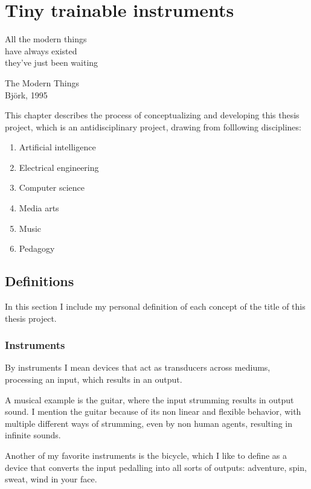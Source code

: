 \chapter{Tiny trainable instruments}

\epigraph{All the modern things \\ have always existed \\ they've just been waiting}{The Modern Things \\ Björk, 1995}

This chapter describes the process of conceptualizing and developing this thesis project, which is an antidisciplinary project, drawing from folllowing disciplines:

\begin{enumerate}
  \item Artificial intelligence
  \item Electrical engineering
  \item Computer science
  \item Media arts
  \item Music
  \item Pedagogy
\end{enumerate}

\section{Definitions}

In this section I include my personal definition of each concept of the title of this thesis project.

\subsection{Instruments}

By instruments I mean devices that act as transducers across mediums, processing an input, which results in an output.

 A musical example is the guitar, where the input strumming results in output sound. I mention the guitar because of its non linear and flexible behavior, with multiple different ways of strumming, even by non human agents, resulting in infinite sounds.

Another of my favorite instruments is the bicycle, which I like to define as a device that converts the input pedalling into all sorts of outputs: adventure, spin, sweat, wind in your face.

